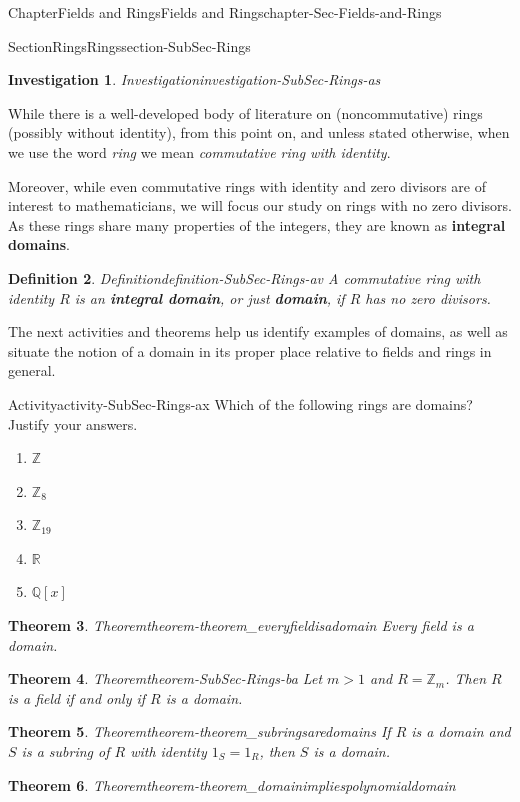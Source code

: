 \documentclass[oneside,10pt,]{book}
\newcommand{\terminology}[1]{\textbf{#1}}
\numberwithin{equation}{section}
\def\Z{{\mathbb Z}}
\def\Q{{\mathbb Q}}
\def\R{{\mathbb R}}
\newtheorem{theorem}{Theorem}[section]
\newtheorem{definition}[theorem]{Definition}
\newtheorem{investigation}[theorem]{Investigation}
\begin{document}
\begin{chapterptx}{Chapter}{Fields and Rings}{}{Fields and Rings}{}{}{chapter-Sec-Fields-and-Rings}
\begin{sectionptx}{Section}{Rings}{}{Rings}{}{}{section-SubSec-Rings}
\begin{investigation}{Investigation}{}{investigation-SubSec-Rings-as}
\end{investigation}%
While there is a well-developed body of literature on (noncommutative) rings (possibly without identity), from this point on, and unless stated otherwise, when we use the word \emph{ring} we mean \emph{commutative ring with identity}.%
\par
Moreover, while even commutative rings with identity and zero divisors are of interest to mathematicians, we will focus our study on rings with no zero divisors. As these rings share many properties of the integers, they are known as \terminology{integral domains}.%
\begin{definition}{Definition}{}{definition-SubSec-Rings-av}%
%
%
A commutative ring with identity \(R\) is an \terminology{integral domain}, or just \terminology{domain}, if \(R\) has no zero divisors.%
\end{definition}
The next activities and theorems help us identify examples of domains, as well as situate the notion of a domain in its proper place relative to fields and rings in general.%
\begin{activity}{Activity}{}{activity-SubSec-Rings-ax}%
Which of the following rings are domains? Justify your answers.%
\begin{enumerate}
\item{}\(\displaystyle \Z\)%
\item{}\(\displaystyle \Z_{8}\)%
\item{}\(\displaystyle \Z_{19}\)%
\item{}\(\displaystyle \R\)%
\item{}\(\displaystyle \Q[x]\)%
\end{enumerate}
%
\end{activity}%
\begin{theorem}{Theorem}{}{}{theorem-theorem_everyfieldisadomain}%
Every field is a domain.%
\end{theorem}
\begin{theorem}{Theorem}{}{}{theorem-SubSec-Rings-ba}%
Let \(m > 1\) and \(R = \Z_m\). Then \(R\) is a field if and only if \(R\) is a domain.%
\end{theorem}
\begin{theorem}{Theorem}{}{}{theorem-theorem_subringsaredomains}%
If \(R\) is a domain and \(S\) is a subring of \(R\) with identity \(1_S = 1_R\), then \(S\) is a domain.%
\end{theorem}
\begin{theorem}{Theorem}{}{}{theorem-theorem_domainimpliespolynomialdomain}%

\end{theorem}
\end{sectionptx}
\end{chapterptx}
\end{document}
